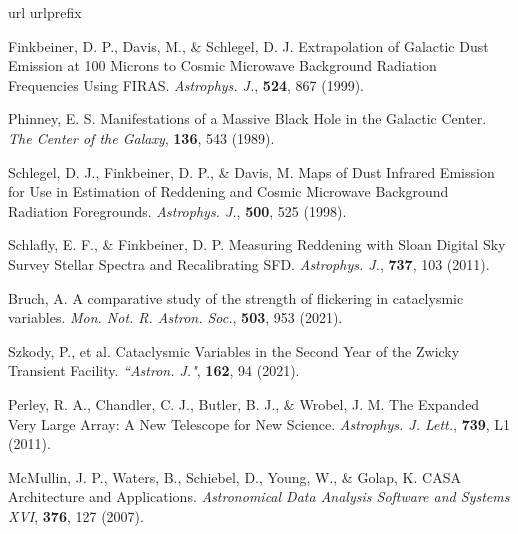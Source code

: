 \documentclass{nature_plusfigure}
\newcommand{\mn}{{Mon. Not. R. Astron. Soc.}}
\newcommand{\mnras}{\mn}
\newcommand{\aj}{{``Astron. J."}}
\newcommand{\apj}{{Astrophys. J.}}
\newcommand{\apjl}{{Astrophys. J. Lett.}}
\begin{document}
\begin{methods}
\vspace{1in}
%
%

\begin{thebibliography}{10}
\expandafter\ifx\csname url\endcsname\relax
  \def\url#1{\texttt{#1}}\fi
\expandafter\ifx\csname urlprefix\endcsname\relax\def\urlprefix{URL }\fi
\providecommand{\bibinfo}[2]{#2}
\providecommand{\eprint}[2][]{\url{#2}}
\makeatletter
\addtocounter{\@listctr}{72}
\makeatother


  Finkbeiner, D. P., Davis, M., \& Schlegel, D. J. Extrapolation of Galactic Dust Emission at 100 Microns to Cosmic Microwave Background Radiation Frequencies Using FIRAS. \emph{\apj}, \textbf{524}, 867 (1999). 

 Phinney, E. S. Manifestations of a Massive Black Hole in the Galactic Center. \emph{The Center of the Galaxy}, \textbf{136}, 543 (1989). 
 
  Schlegel, D. J., Finkbeiner, D. P., \& Davis, M. Maps of Dust Infrared Emission for Use in Estimation of Reddening and Cosmic Microwave Background Radiation Foregrounds. \emph{\apj}, \textbf{500}, 525 (1998). 

  Schlafly, E. F., \& Finkbeiner, D. P. Measuring Reddening with Sloan Digital Sky Survey Stellar Spectra and Recalibrating SFD. \emph{\apj}, \textbf{737}, 103 (2011). 

 Bruch, A. A comparative study of the strength of flickering in cataclysmic variables. \emph{\mnras}, \textbf{503}, 953 (2021). 

 Szkody, P., et al. Cataclysmic Variables in the Second Year of the Zwicky Transient Facility. \emph{\aj}, \textbf{162}, 94 (2021). 

 Perley, R. A., Chandler, C. J., Butler, B. J., \& Wrobel, J. M. The Expanded Very Large Array: A New Telescope for New Science. \emph{\apjl}, \textbf{739}, L1 (2011). 

 McMullin, J. P., Waters, B., Schiebel, D., Young, W., \& Golap, K. CASA Architecture and Applications. \emph{Astronomical Data Analysis Software and Systems XVI}, \textbf{376}, 127 (2007). 


\end{thebibliography}
\end{methods}
\end{document}
